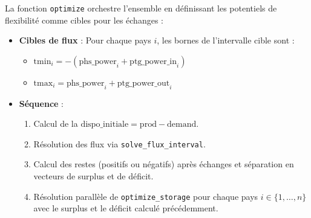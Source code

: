 \documentclass[12pt,a4paper]{article}
\begin{document}
La fonction \texttt{optimize} orchestre l'ensemble en définissant les potentiels de flexibilité comme cibles pour les échanges :
\begin{itemize}[label=\textbullet]
    \item \textbf{Cibles de flux} : Pour chaque pays $i$, les bornes de l'intervalle cible sont :
    \begin{itemize}
        \item $\mathrm{tmin}_i = -(\mathrm{phs\_power}_i + \mathrm{ptg\_power\_in}_i)$
        \item $\mathrm{tmax}_i = \mathrm{phs\_power}_i + \mathrm{ptg\_power\_out}_i$
    \end{itemize}
    \item \textbf{Séquence} :
    \begin{enumerate}
        \item Calcul de la $\mathrm{dispo\_initiale} = \mathrm{prod} - \mathrm{demand}$.
        \item Résolution des flux via \texttt{solve\_flux\_interval}.
        \item Calcul des restes (positifs ou négatifs) après échanges et séparation en vecteurs de surplus et de déficit.
        \item Résolution parallèle de \texttt{optimize\_storage} pour chaque pays $i \in \{1, \dots, n\}$ avec le surplus et le déficit calculé précédemment.
    \end{enumerate}
\end{itemize}
\end{document}
